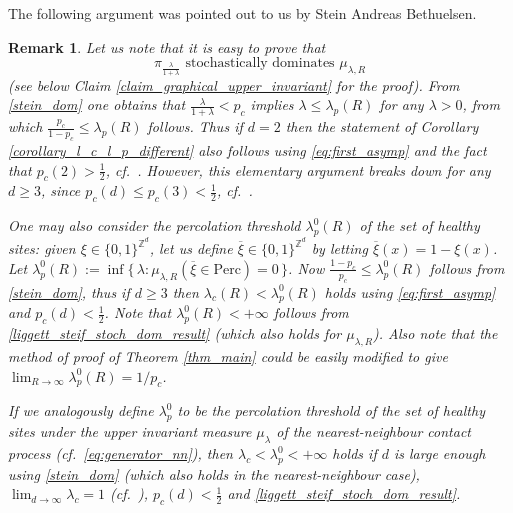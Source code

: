 \documentclass[a4paper,12pt]{article}
\newtheorem  {remark}        [theorem]{Remark}
\newcommand{\Z}{\mathbb{Z}}
\begin{document}
The following argument was pointed out to us by Stein Andreas Bethuelsen.
\begin{remark}\label{remark_stein_ideas}
Let us note that it is easy to prove that
\begin{equation}\label{stein_dom}
\pi_{\frac{\lambda}{1+\lambda}} \text{ stochastically dominates } \mu_{\lambda,R}
\end{equation}
 (see below Claim \ref{claim_graphical_upper_invariant} for the proof).
From \eqref{stein_dom} one obtains that $\frac{\lambda}{1+\lambda} < p_c$ implies $\lambda \leq \lambda_p(R)$ for any $\lambda >0$, from which $\frac{p_c}{1-p_c} \leq \lambda_p(R)$ follows.
Thus if $d=2$ then the statement of Corollary \ref{corollary_l_c_l_p_different} also follows using \eqref{eq:first_asymp} and the fact that $p_c(2)>\frac{1}{2}$, cf.\ \cite{H82}.
However, this elementary argument breaks down for any $d\geq 3$, since $p_c(d) \leq p_c(3) < \frac{1}{2}$, cf.\ \cite{CR85}.

\smallskip

One may also consider the percolation threshold $\lambda^0_p(R)$ of the set of healthy sites: given $\xi \in \{0,1\}^{\Z^d}$, let us define $\overline{\xi} \in \{0,1\}^{\Z^d}$
by letting $\overline{\xi}(x)=1-\xi(x)$. Let $\lambda^0_p(R):= \inf\{ \, \lambda: \mu_{\lambda,R}( \overline{\xi} \in \text{Perc}) = 0 \, \}$. Now $\frac{1-p_c}{p_c} \leq \lambda^0_p(R)$ follows from \eqref{stein_dom}, thus if $d \geq 3$ then $\lambda_c(R) < \lambda^0_p(R)$ holds using \eqref{eq:first_asymp} and $p_c(d) < \frac{1}{2}$.
Note that
$\lambda^0_p(R)<+\infty$ follows from \eqref{liggett_steif_stoch_dom_result} (which also holds for $\mu_{\lambda,R}$). Also note that the method of proof of Theorem \ref{thm_main}
could be easily modified to give $\lim_{R \to \infty} \lambda^0_p(R)=1/p_c$.

\smallskip

If we analogously define $\lambda^0_p$ to be the percolation threshold of the set of healthy sites under  the upper invariant measure $\mu_\lambda$ of the nearest-neighbour contact process (cf.\ \eqref{eq:generator_nn}), then
$ \lambda_c < \lambda^0_p < +\infty  $ holds if $d$ is large enough using \eqref{stein_dom} (which also holds in the nearest-neighbour case), $ \lim_{d \to \infty} \lambda_c=1$
(cf.\ \cite[(7)]{SV86}), $p_c(d) < \frac{1}{2}$ and \eqref{liggett_steif_stoch_dom_result}.
 \end{remark}
\end{document}

